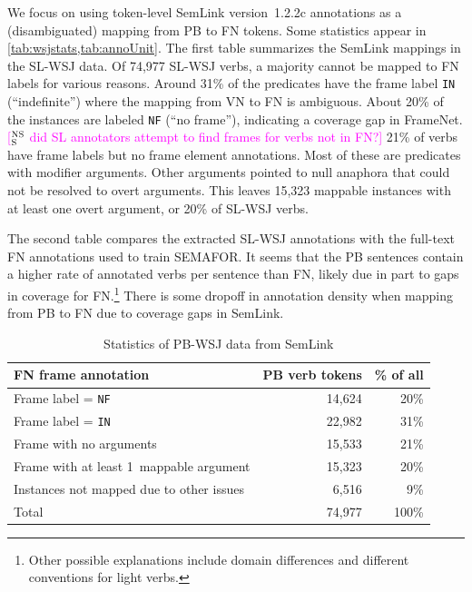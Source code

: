 \documentclass[11pt]{article}
\newcommand{\ensuretext}[1]{#1}
\newcommand{\nssmarker}{\ensuretext{\textcolor{magenta}{\ensuremath{^{\textsc{NS}}_{\textsc{S}}}}}}
\newcommand{\arkcomment}[3]{\ensuretext{\textcolor{#3}{[#1 #2]}}}
\newcommand{\nss}[1]{\arkcomment{\nssmarker}{#1}{magenta}}
\begin{document}
We focus on using token-level SemLink version~1.2.2c annotations as a (disambiguated) mapping from PB to FN tokens.
Some statistics appear in \cref{tab:wsjstats,tab:annoUnit}. The first table summarizes the SemLink mappings in the SL-WSJ data. 
Of 74,977 SL-WSJ verbs, a majority cannot be mapped to FN labels for various reasons. 
Around 31\% of the predicates have the frame label \texttt{IN} (``indefinite'') where the mapping from VN to FN is ambiguous. 
About 20\% of the instances are labeled \texttt{NF} (``no frame''), indicating a coverage gap in FrameNet.\nss{did SL annotators attempt to find frames for verbs not in FN?}
21\% of verbs have frame labels but no frame element annotations. 
Most of these are predicates with modifier arguments. 
Other arguments pointed to null anaphora that could not be resolved to overt arguments.
This leaves 15,323 mappable instances with at least one overt argument, or 20\% of SL-WSJ verbs.

The second table compares the extracted SL-WSJ annotations with the full-text FN annotations used to train SEMAFOR. 
It seems that the PB sentences contain a higher rate of annotated verbs per sentence than FN, 
likely due in part to gaps in coverage for FN.\footnote{Other possible explanations include domain differences and different conventions for light verbs.}
There is some dropoff in annotation density when mapping from PB to FN due to coverage gaps in SemLink.

\begin{table}\centering\small
\begin{tabular}{@{}>{\raggedright}p{13em}@{~~}r@{~~}r@{}}
\bf FN frame annotation & \bf PB verb tokens & \bf \% of all \\ \hline
Frame label = \texttt{NF} & 14,624 & 20\%\\ 
Frame label = \texttt{IN} & 22,982 & 31\% \\ 
Frame with no arguments & 15,533 & 21\% \\ 
Frame with at least 1~mappable argument  & 15,323 & 20\% \\ 
Instances not mapped due to other issues & 6,516 & 9\% \\ \hline 
Total  & 74,977 & 100\% \\
\end{tabular}
\caption{Statistics of PB-WSJ data from SemLink}
\label{tab:wsjstats}
\end{table}
\end{document}
